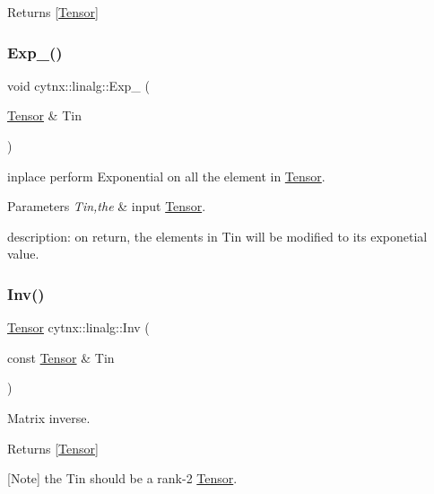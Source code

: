 \begin{DoxyReturn}{Returns}
\mbox{[}\hyperlink{classcytnx_1_1Tensor}{Tensor}\mbox{]} 
\end{DoxyReturn}
\mbox{\label{namespacecytnx_1_1linalg_aaab08439dde94ee87939d07933ede6e3}} 
\subsubsection{\texorpdfstring{Exp\+\_\+()}{Exp\_()}}
{\footnotesize\ttfamily void cytnx\+::linalg\+::\+Exp\+\_\+ (\begin{DoxyParamCaption}\item[{\hyperlink{classcytnx_1_1Tensor}{Tensor} \&}]{Tin }\end{DoxyParamCaption})}



inplace perform Exponential on all the element in \hyperlink{classcytnx_1_1Tensor}{Tensor}. 


\begin{DoxyParams}{Parameters}
{\em Tin,the} & input \hyperlink{classcytnx_1_1Tensor}{Tensor}.\\
\hline
\end{DoxyParams}
description\+: on return, the elements in Tin will be modified to it\textquotesingle{}s exponetial value. \mbox{\label{namespacecytnx_1_1linalg_a351ad02f478ba8082ee79a37a2a8f108}} 
\subsubsection{\texorpdfstring{Inv()}{Inv()}}
{\footnotesize\ttfamily \hyperlink{classcytnx_1_1Tensor}{Tensor} cytnx\+::linalg\+::\+Inv (\begin{DoxyParamCaption}\item[{const \hyperlink{classcytnx_1_1Tensor}{Tensor} \&}]{Tin }\end{DoxyParamCaption})}



Matrix inverse. 

\begin{DoxyReturn}{Returns}
\mbox{[}\hyperlink{classcytnx_1_1Tensor}{Tensor}\mbox{]}
\end{DoxyReturn}
\mbox{[}Note\mbox{]} the Tin should be a rank-\/2 \hyperlink{classcytnx_1_1Tensor}{Tensor}. \mbox{\label{namespacecytnx_1_1linalg_a26628db51e90867ddc050ab11a317a8d}} 
